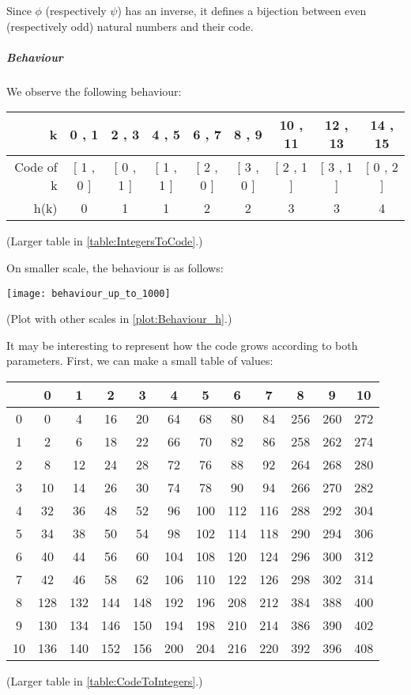Since $\phi$ (respectively $\psi$) has an inverse, it defines a bijection between even (respectively odd) natural numbers and their code.

\subparagraph{Behaviour}
We observe the following behaviour:
\begin{center}
	\begin{tabular}{|r||c|c|c|c|c|c|c|c|}
		\hline
		\textbf{k} & \textbf{0 , 1} & \textbf{2 , 3} & \textbf{4 , 5} & \textbf{6 , 7} & \textbf{8 , 9} & \textbf{10 , 11} & \textbf{12 , 13} & \textbf{14 , 15} \\
		\hline \hline
		Code of k & [ 1 , 0 ] & [ 0 , 1 ] & [ 1 , 1 ] & [ 2 , 0 ] & [ 3 , 0 ] & [ 2 , 1 ] & [ 3 , 1 ] & [ 0 , 2 ] \\
		\hline
		h(k) & 0 & 1 & 1 & 2 & 2 & 3 & 3 & 4 \\
		\hline
	\end{tabular}

	(Larger table in \ref{table:IntegersToCode}.)
\end{center}


On smaller scale, the behaviour is as follows:\\
\begin{center}
	\texttt{[image: behaviour\_up\_to\_1000]}
	
	(Plot with other scales in \ref{plot:Behaviour_h}.)
\end{center}

It may be interesting to represent how the code grows according to both parameters.
First, we can make a small table of values:
\begin{center}
	\begin{tabular}{|c||c|c|c|c|c|c|c|c|c|c|c|}
		\hline
		\textbf{} & \textbf{0} & \textbf{1} & \textbf{2} & \textbf{3} & \textbf{4} & \textbf{5} & \textbf{6} & \textbf{7} & \textbf{8} & \textbf{9} & \textbf{10} \\\hline\hline
		0 & 0 & 4 & 16 & 20 & 64 & 68 & 80 & 84 & 256 & 260 & 272 \\
		1 & 2 & 6 & 18 & 22 & 66 & 70 & 82 & 86 & 258 & 262 & 274 \\
		2 & 8 & 12 & 24 & 28 & 72 & 76 & 88 & 92 & 264 & 268 & 280 \\
		3 & 10 & 14 & 26 & 30 & 74 & 78 & 90 & 94 & 266 & 270 & 282 \\
		4 & 32 & 36 & 48 & 52 & 96 & 100 & 112 & 116 & 288 & 292 & 304 \\
		5 & 34 & 38 & 50 & 54 & 98 & 102 & 114 & 118 & 290 & 294 & 306 \\
		6 & 40 & 44 & 56 & 60 & 104 & 108 & 120 & 124 & 296 & 300 & 312 \\
		7 & 42 & 46 & 58 & 62 & 106 & 110 & 122 & 126 & 298 & 302 & 314 \\
		8 & 128 & 132 & 144 & 148 & 192 & 196 & 208 & 212 & 384 & 388 & 400 \\
		9 & 130 & 134 & 146 & 150 & 194 & 198 & 210 & 214 & 386 & 390 & 402 \\
		10 & 136 & 140 & 152 & 156 & 200 & 204 & 216 & 220 & 392 & 396 & 408 \\
		\hline
	\end{tabular}

	(Larger table in \ref{table:CodeToIntegers}.)
\end{center}

